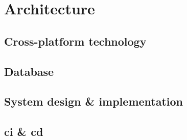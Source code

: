 \chapter{Architecture} \label{chapter5}

\section{Cross-platform technology} \label{5:technology}

\section{Database} \label{5:database}

\section{System design \& implementation} \label{5:implementation}

\section{\acrshort{ci} \& \acrshort{cd}} \label{6:cicd}